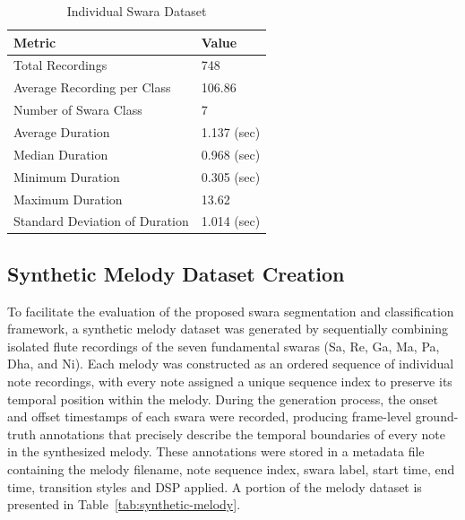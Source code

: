\begin{table}[H]
\centering
\caption{Individual Swara Dataset}
\label{tab:individual-swara}
\begin{tabular}{ll}
\toprule
\textbf{Metric} & \textbf{Value} \\
\midrule
Total Recordings & 748 \\
Average Recording per Class & 106.86 \\
Number of Swara Class & 7 \\
Average Duration & 1.137 (sec) \\
Median Duration & 0.968 (sec) \\
Minimum Duration & 0.305 (sec) \\
Maximum Duration & 13.62 \\
Standard Deviation of Duration & 1.014 (sec) \\
\bottomrule
\end{tabular}
\end{table}

\subsection*{Synthetic Melody Dataset Creation}

To facilitate the evaluation of the proposed swara segmentation and classification framework, a synthetic melody dataset was generated by sequentially combining isolated flute recordings of the seven fundamental swaras (Sa, Re, Ga, Ma, Pa, Dha, and Ni). Each melody was constructed as an ordered sequence of individual note recordings, with every note assigned a unique sequence index to preserve its temporal position within the melody. During the generation process, the onset and offset timestamps of each swara were recorded, producing frame-level ground-truth annotations that precisely describe the temporal boundaries of every note in the synthesized melody. These annotations were stored in a metadata file containing the melody filename, note sequence index, swara label, start time, end time, transition styles and DSP applied. A portion of the melody dataset is presented in Table~\ref{tab:synthetic-melody}.

